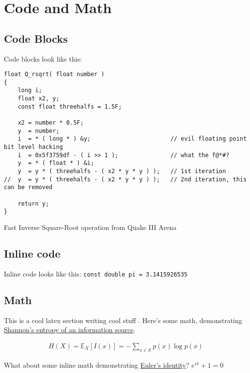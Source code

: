
\section{Code and Math} %
\label{sec:code_and_math}

\subsection{Code Blocks} %
\label{sub:code_blocks}

Code blocks look like this:

	\begin{listing}[H]
	\begin{verbatim}
float Q_rsqrt( float number )
{
	long i;
	float x2, y;
	const float threehalfs = 1.5F;

	x2 = number * 0.5F;
	y  = number;
	i  = * ( long * ) &y;                       // evil floating point bit level hacking
	i  = 0x5f3759df - ( i >> 1 );               // what the f@*#? 
	y  = * ( float * ) &i;
	y  = y * ( threehalfs - ( x2 * y * y ) );   // 1st iteration
//	y  = y * ( threehalfs - ( x2 * y * y ) );   // 2nd iteration, this can be removed

	return y;
}
	\end{verbatim}
	\caption{Fast Inverse Square-Root operation from Quake III Arena \parencite{quake}}
	\end{listing}

\subsection{Inline code} %
\label{sub:inline_code}
Inline code looks like this: \texttt{const double pi = 3.1415926535}

\subsection{Math} %
\label{sub:math}
This is a cool latex section writing cool stuff \parencite{article}. Here's some math, demonstrating \href{https://en.wikipedia.org/wiki/Information_theory#Entropy_of_an_information_source}{Shannon's entropy of an information source}.

\begin{equation}
\begin{split}
H(X) = \mathbb{E}_X [I(x)] = -\sum_{x \in \mathbb{X}}p(x)\log p(x)
\end{split}
\end{equation}

What about some inline math demonstrating \href{https://en.wikipedia.org/wiki/Euler%27s_identity}{Euler's identity}? $e^{i\pi} + 1 = 0$

